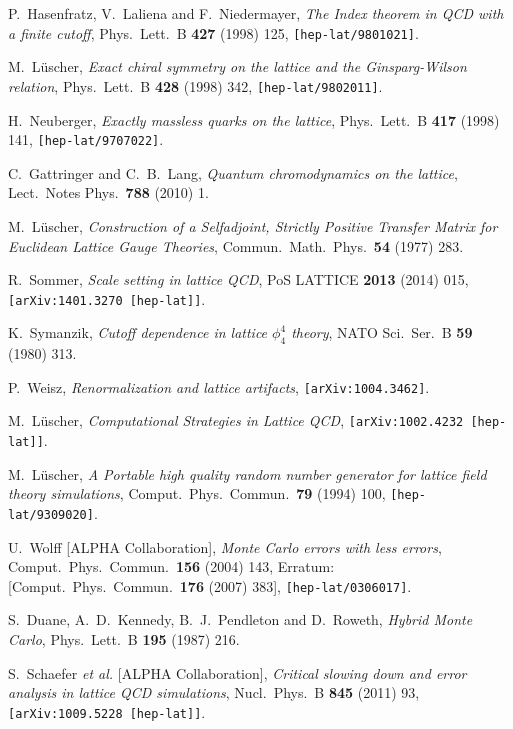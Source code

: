 \documentclass{PoS}
\begin{document}
\begin{thebibliography}{99}
  P.~Hasenfratz, V.~Laliena and F.~Niedermayer,
  \emph{The Index theorem in QCD with a finite cutoff},
  Phys.\ Lett.\ B {\bf 427} (1998) 125,
  {\tt [hep-lat/9801021]}.

  M.~L{\"u}scher,
  \emph{Exact chiral symmetry on the lattice and the Ginsparg-Wilson relation},
  Phys.\ Lett.\ B {\bf 428} (1998) 342,
  {\tt [hep-lat/9802011]}.

  H.~Neuberger,
  \emph{Exactly massless quarks on the lattice},
  Phys.\ Lett.\ B {\bf 417} (1998) 141,
  {\tt [hep-lat/9707022]}.

  C.~Gattringer and C.~B.~Lang,
  \emph{Quantum chromodynamics on the lattice},
  Lect.\ Notes Phys.\  {\bf 788} (2010) 1.

  M.~L{\"u}scher,
  \emph{Construction of a Selfadjoint, Strictly Positive Transfer Matrix for Euclidean Lattice Gauge Theories},
  Commun.\ Math.\ Phys.\  {\bf 54} (1977) 283.

  R.~Sommer,
  \emph{Scale setting in lattice QCD},
  PoS LATTICE {\bf 2013} (2014) 015,
  {\tt [arXiv:1401.3270 [hep-lat]]}.

  K.~Symanzik,
  \emph{Cutoff dependence in lattice $\phi^4_4$ theory},
  NATO Sci.\ Ser.\ B {\bf 59} (1980) 313.

  P.~Weisz,
  \emph{Renormalization and lattice artifacts},
  {\tt [arXiv:1004.3462]}.

  M.~L{\"u}scher,
  \emph{Computational Strategies in Lattice QCD},
  {\tt [arXiv:1002.4232 [hep-lat]]}.

  M.~L{\"u}scher,
  \emph{A Portable high quality random number generator for lattice field theory simulations},
  Comput.\ Phys.\ Commun.\  {\bf 79} (1994) 100,
  {\tt [hep-lat/9309020]}.

  U.~Wolff [ALPHA Collaboration],
  \emph{Monte Carlo errors with less errors},
  Comput.\ Phys.\ Commun.\  {\bf 156} (2004) 143,
  Erratum: [Comput.\ Phys.\ Commun.\  {\bf 176} (2007) 383],
  {\tt [hep-lat/0306017]}.

  S.~Duane, A.~D.~Kennedy, B.~J.~Pendleton and D.~Roweth,
  \emph{Hybrid Monte Carlo},
  Phys.\ Lett.\ B {\bf 195} (1987) 216.

  S.~Schaefer {\it et al.} [ALPHA Collaboration],
  \emph{Critical slowing down and error analysis in lattice QCD simulations},
  Nucl.\ Phys.\ B {\bf 845} (2011) 93,
  {\tt [arXiv:1009.5228 [hep-lat]]}.


\end{thebibliography}
\end{document}
